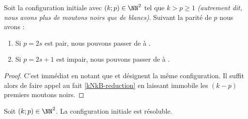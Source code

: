 \begin{fact}
    Soit la configuration initiale  avec $(k ; p) \in \NN^2$ tel que $k > p \geq 1$ \emph{(autrement dit, nous avons plus de moutons noirs que de blancs)}. Suivant la parité de $p$ nous avons :
    \begin{enumerate}
        \item Si $p = 2s$ est pair, nous pouvons passer de  à  .

        \item Si $p = 2s+1$ est impair, nous pouvons passer de  à  .
    \end{enumerate}
\end{fact}


\begin{proof}
    C'est immédiat en notant que  et  désignent la même configuration.
    Il suffit alors de faire appel au fait \ref{kNkB-reduction} en laissant immobile les $(k-p)$ premiers moutons noirs.
\end{proof}



\begin{fact}
    Soit $(k ; p) \in \NN^2$.
    La configuration initiale  est résoluble.
\end{fact}


